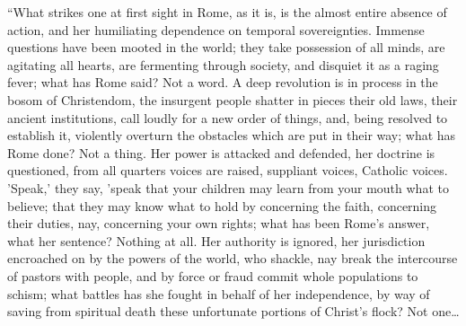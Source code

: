 ``What
strikes one at first sight in Rome, as it is, is the almost entire
absence of action, and her humiliating dependence on temporal
sovereignties. Immense questions have been mooted in the world; they
take possession of all minds, are agitating all hearts, are fermenting
through society, and disquiet it as a raging fever; what has Rome
said? Not a word. A deep revolution is in process in the bosom of
Christendom, the insurgent people shatter in pieces their old laws,
their ancient institutions, call loudly for a new order of things,
and, being resolved to establish it, violently overturn the obstacles
which are put in their way; what has Rome done? Not a thing. Her power
is attacked and defended, her doctrine is questioned, from all
quarters voices are raised, suppliant voices, Catholic voices.
'Speak,' they say, 'speak that your children may learn from your mouth
what to believe; that they may know what to hold by concerning the
faith, concerning their duties, nay, concerning your own rights; what
has been Rome's answer, what her sentence? Nothing at all. Her
authority is ignored, her jurisdiction encroached on by the powers of
the world, who shackle, nay break the intercourse of pastors with
people, and by force or fraud commit whole populations to schism; what
battles has she fought in behalf of her independence, by way of saving
from spiritual death these unfortunate portions of Christ's flock? Not
one…

